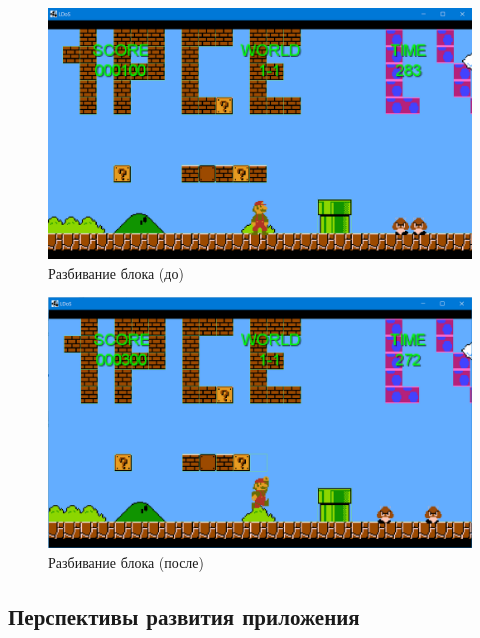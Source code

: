 \begin{figure}[H]
	\begin{center}
		\includegraphics[scale=0.7]{pics/Screenshot_9.png}
		\caption{Разбивание блока (до)} 
		\label{pic:pic_name} %
	\end{center}
\end{figure}

\begin{figure}[H]
	\begin{center}
		\includegraphics[scale=0.7]{pics/Screenshot_10.png}
		\caption{Разбивание блока (после)} 
		\label{pic:pic_name} %
	\end{center}
\end{figure}




\subsection{Перспективы развития приложения}

